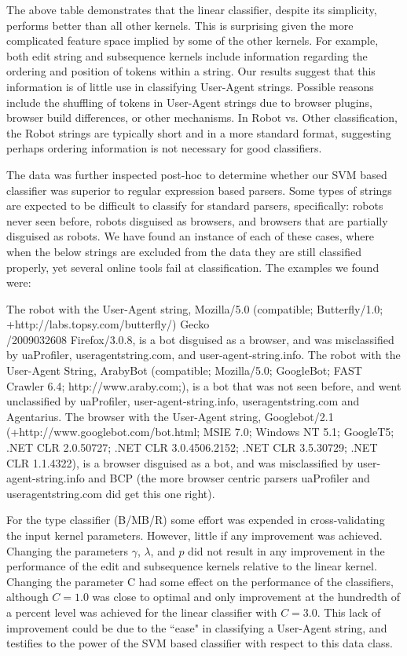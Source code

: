 \documentclass[10pt]{article}
\begin{document}
\begin{multicols}{2}
The above table demonstrates that the linear classifier, despite its simplicity, performs better than all other kernels.  This is surprising given the more complicated feature space implied by some of the other kernels.  For example, both edit string and subsequence kernels include information regarding the ordering and position of tokens within a string.  Our results suggest that this information is of little use in classifying User-Agent strings.  Possible reasons include the shuffling of tokens in User-Agent strings due to browser plugins, browser build differences, or other mechanisms.  In Robot vs. Other classification, the Robot strings are typically short and in a more standard format, suggesting perhaps ordering information is not necessary for good classifiers.  

The data was further inspected post-hoc to determine whether our SVM based classifier was superior to regular expression based parsers.  Some types of strings are expected to be difficult to classify for standard parsers, specifically: robots never seen before, robots disguised as browsers, and browsers that are partially disguised as robots.  We have found an instance of each of these cases, where when the below strings are excluded from the data they are still classified properly, yet several online tools fail at classification.  The examples we found were: 

The robot with the User-Agent string, Mozilla/5.0 (compatible; Butterfly/1.0; \\+http://labs.topsy.com/butterfly/) Gecko\\/2009032608 Firefox/3.0.8, is a bot disguised as a browser, and was misclassified by uaProfiler, useragentstring.com, and user-agent-string.info. 
The robot with the User-Agent String,  ArabyBot (compatible; Mozilla/5.0; GoogleBot; FAST Crawler 6.4; http://www.araby.com;), is a bot that was not seen before, and went unclassified by uaProfiler, user-agent-string.info, useragentstring.com and Agentarius.  
The browser with the User-Agent string, Googlebot/2.1 (+http://www.googlebot.com/bot.html; MSIE 7.0; Windows NT 5.1; GoogleT5; .NET CLR 2.0.50727; .NET CLR 3.0.4506.2152; .NET CLR 3.5.30729; .NET CLR 1.1.4322), is a browser disguised as a bot, and was misclassified by user-agent-string.info and BCP (the more browser centric parsers uaProfiler and useragentstring.com did get this one right).  

For the type classifier (B/MB/R) some effort was expended in cross-validating the input kernel parameters.  However, little if any improvement was achieved.  Changing the parameters $\gamma$, $\lambda$, and $p$ did not result in any improvement in the performance of the edit and subsequence kernels relative to the linear kernel.  Changing the parameter C had some effect on the performance of the classifiers, although $C = 1.0$ was close to optimal and only improvement at the hundredth of a percent level was achieved for the linear classifier with $C = 3.0$.  This lack of improvement could be due to the ``ease" in classifying a User-Agent string, and testifies to the power of the SVM based classifier with respect to this data class.


\end{multicols}
\end{document}
